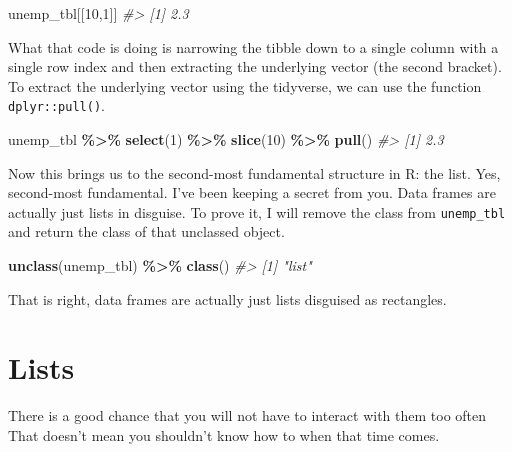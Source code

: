 \documentclass[
]{book}
\newenvironment{Shaded}{\begin{snugshade}}{\end{snugshade}}
\newcommand{\CommentTok}[1]{\textcolor[rgb]{0.56,0.35,0.01}{\textit{#1}}}
\newcommand{\DecValTok}[1]{\textcolor[rgb]{0.00,0.00,0.81}{#1}}
\newcommand{\KeywordTok}[1]{\textcolor[rgb]{0.13,0.29,0.53}{\textbf{#1}}}
\newcommand{\NormalTok}[1]{#1}
\newcommand{\OperatorTok}[1]{\textcolor[rgb]{0.81,0.36,0.00}{\textbf{#1}}}
\newcommand{\StringTok}[1]{\textcolor[rgb]{0.31,0.60,0.02}{#1}}
\begin{document}
\begin{Shaded}
\begin{Highlighting}[]
\NormalTok{unemp\_tbl[[}\DecValTok{10}\NormalTok{,}\DecValTok{1}\NormalTok{]]}
\CommentTok{\#\textgreater{} [1] 2.3}
\end{Highlighting}
\end{Shaded}

What that code is doing is narrowing the tibble down to a single column with a single row index and then extracting the underlying vector (the second bracket). To extract the underlying vector using the tidyverse, we can use the function \texttt{dplyr::pull()}.

\begin{Shaded}
\begin{Highlighting}[]
\NormalTok{unemp\_tbl }\OperatorTok{\%\textgreater{}\%}\StringTok{ }
\StringTok{  }\KeywordTok{select}\NormalTok{(}\DecValTok{1}\NormalTok{) }\OperatorTok{\%\textgreater{}\%}\StringTok{ }
\StringTok{  }\KeywordTok{slice}\NormalTok{(}\DecValTok{10}\NormalTok{) }\OperatorTok{\%\textgreater{}\%}\StringTok{ }
\StringTok{  }\KeywordTok{pull}\NormalTok{()}
\CommentTok{\#\textgreater{} [1] 2.3}
\end{Highlighting}
\end{Shaded}

Now this brings us to the second-most fundamental structure in R: the list. Yes, second-most fundamental. I've been keeping a secret from you. Data frames are actually just lists in disguise. To prove it, I will remove the class from \texttt{unemp\_tbl} and return the class of that unclassed object.

\begin{Shaded}
\begin{Highlighting}[]
\KeywordTok{unclass}\NormalTok{(unemp\_tbl) }\OperatorTok{\%\textgreater{}\%}\StringTok{ }
\StringTok{  }\KeywordTok{class}\NormalTok{()}
\CommentTok{\#\textgreater{} [1] "list"}
\end{Highlighting}
\end{Shaded}

That is right, data frames are actually just lists disguised as rectangles.

\hypertarget{lists}{%
\section{Lists}\label{lists}}

There is a good chance that you will not have to interact with them too often That doesn't mean you shouldn't know how to when that time comes.
\end{document}
